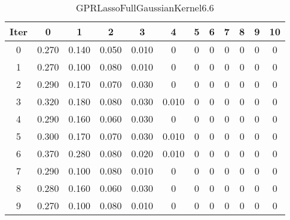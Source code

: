 \begin{table}
	\begin{center}
		\begin{tabular}{|c|c|c|c|c|c|c|c|c|c|c|c|}
			\hline
			Iter & 0 & 1 & 2 & 3 & 4 & 5 & 6 & 7 & 8 & 9 & 10 \\
			\hline
			0 & 0.270 & 0.140 & 0.050 & 0.010 & 0 & 0 & 0 & 0 & 0 & 0 & 0 \\
			\hline
			1 & 0.270 & 0.100 & 0.080 & 0.010 & 0 & 0 & 0 & 0 & 0 & 0 & 0 \\
			\hline
			2 & 0.290 & 0.170 & 0.070 & 0.030 & 0 & 0 & 0 & 0 & 0 & 0 & 0 \\
			\hline
			3 & 0.320 & 0.180 & 0.080 & 0.030 & 0.010 & 0 & 0 & 0 & 0 & 0 & 0 \\
			\hline
			4 & 0.290 & 0.160 & 0.060 & 0.030 & 0 & 0 & 0 & 0 & 0 & 0 & 0 \\
			\hline
			5 & 0.300 & 0.170 & 0.070 & 0.030 & 0.010 & 0 & 0 & 0 & 0 & 0 & 0 \\
			\hline
			6 & 0.370 & 0.280 & 0.080 & 0.020 & 0.010 & 0 & 0 & 0 & 0 & 0 & 0 \\
			\hline
			7 & 0.290 & 0.100 & 0.080 & 0.010 & 0 & 0 & 0 & 0 & 0 & 0 & 0 \\
			\hline
			8 & 0.280 & 0.160 & 0.060 & 0.030 & 0 & 0 & 0 & 0 & 0 & 0 & 0 \\
			\hline
			9 & 0.270 & 0.100 & 0.080 & 0.010 & 0 & 0 & 0 & 0 & 0 & 0 & 0 \\
			\hline
		\end{tabular}
	\end{center}
	\caption{GPRLassoFullGaussianKernel6.6}
\end{table}